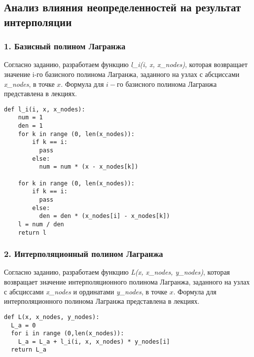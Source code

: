 %


\clearpage
\subsection{Анализ влияния неопределенностей 
на результат\\ интерполяции}
\subsubsection{1. Базисный полином Лагранжа}

Согласно заданию, разработаем функцию \textit{l_i(i, x, x_nodes)}, которая возвращает значение i-го базисного полинома Лагранжа, заданного на узлах с абсциссами \textit{x_nodes}, в точке $x$. Формула для  $i-го$ базисного полинома Лагранжа представлена в лекциях.
\begin{lstlisting} 
def l_i(i, x, x_nodes):
    num = 1 
    den = 1
    for k in range (0, len(x_nodes)):
        if k == i:
          pass
        else:
          num = num * (x - x_nodes[k])

    for k in range (0, len(x_nodes)):
        if k == i:
          pass
        else:
          den = den * (x_nodes[i] - x_nodes[k])
    l = num / den
    return l
\end{lstlisting} 
\subsubsection{2. Интерполяционный полином Лагранжа }
Согласно заданию, разработаем функцию  \textit{L(x, x_nodes, y_nodes)}, которая возвращает значение интерполяционного полинома Лагранжа, заданного на узлах с абсциссами \textit{x_nodes} и ординатами \textit{y_nodes}, в точке $x$.
Формула для интерполяционного полинома Лагранжа представлена в лекциях.
\begin{lstlisting} 
def L(x, x_nodes, y_nodes):
  L_a = 0
  for i in range (0,len(x_nodes)):
    L_a = L_a + l_i(i, x, x_nodes) * y_nodes[i]
  return L_a
\end{lstlisting} 

